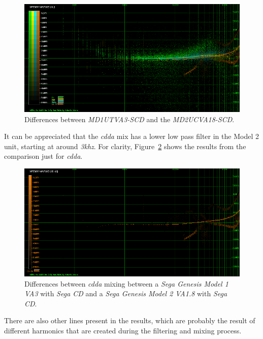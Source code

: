 \documentclass[10pt,a4paper]{report}
\newcommand{\ac}[1]{\textit{\mbox{\acrshort{#1}}}}
\newcommand{\khz}[1]{\textit{\mbox{#1\acrshort{khz}}}}
\begin{document}
\begin{figure}[H]
	\centering
	\includegraphics[width=1.0\linewidth]{images/results/13-A-MD1UTVA3-SCD-LA_vs_A-MD2UCVA18-SCD.png}
	\caption[A-MD1UTVA3-SCD-LA vs A-MD2UCVA18-SCD]{Differences between  \textit{MD1UTVA3-SCD} and the \textit{MD2UCVA18-SCD}.}
	\label{fig:A-MD1UTVA3-SCD-LA_vs_A-MD2UCVA18-SCD}
\end{figure}

It can be appreciated that the \ac{cdda} mix has a lower low pass filter in the Model 2 unit, starting at around \khz{3}. For clarity, Figure~\ref{fig:A-MD1UTVA3-SCD-LA_vs_A-MD2UCVA18-SCD-LA_04CD-DA} shows the results from the comparison just for \ac{cdda}.

\begin{figure}[H]
	\centering
	\includegraphics[width=1.0\linewidth]{images/results/14-A-MD1UTVA3-SCD-LA_vs_A-MD2UCVA18-SCD-LA_04CD-DA.png}
	\caption[A-MD1UTVA3-SCD-LA_vs_A-MD2UCVA18-SCD-LA_04CD-DA]{Differences between \ac{cdda} mixing between a \textit{Sega Genesis Model 1 VA3} with \textit{Sega CD} and a \textit{Sega Genesis Model 2 VA1.8} with \textit{Sega CD}.}
	\label{fig:A-MD1UTVA3-SCD-LA_vs_A-MD2UCVA18-SCD-LA_04CD-DA}
\end{figure}

There are also other lines present in the results, which are probably the result of different harmonics that are created during the filtering and mixing process.
\end{document}
